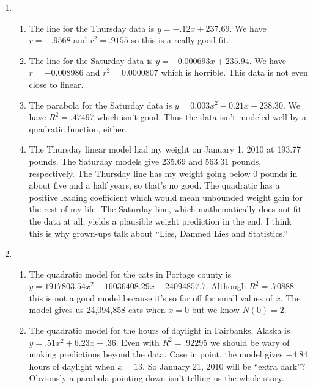 \documentclass{ximera}
\begin{document}
\begin{enumerate}
\setcounter{enumi}{\value{HW}}

\item \begin{enumerate}

\item The line for the Thursday data is $y = -.12x + 237.69$.  We have $r = -.9568$ and $r^{2} = .9155$ so this is a really good fit.

\item The line for the Saturday data is $y = -0.000693x + 235.94$.  We have $r = -0.008986$ and $r^{2} = 0.0000807$ which is horrible.  This data is not even close to linear.  

\item The parabola for the Saturday data is $y = 0.003x^{2} - 0.21x + 238.30$.  We have $R^{2} = .47497$ which isn't good.  Thus the data isn't modeled well by a quadratic function, either.

\item The Thursday linear model had my weight on January 1, 2010 at 193.77 pounds.  The Saturday models give 235.69 and 563.31 pounds, respectively.  The Thursday line has my weight going below 0 pounds in about five and a half years, so that's no good.  The quadratic has a positive leading coefficient which would mean unbounded weight gain for the rest of my life.  The Saturday line, which mathematically does not fit the data at all, yields a plausible weight prediction in the end.  I think this is why grown-ups talk about ``Lies, Damned Lies and Statistics.''

\end{enumerate}

\item \begin{enumerate}

\item The quadratic model for the cats in Portage county is $y = 1917803.54x^{2} - 16036408.29x + 24094857.7$.  Although $R^{2} = .70888$ this is not a good model because it's so far off for small values of $x$.  The model gives us 24,094,858 cats when $x = 0$ but we know $N(0) = 2$.

\item The quadratic model for the hours of daylight in Fairbanks, Alaska is $y = .51x^{2} + 6.23x - .36$.  Even with $R^{2} = .92295$ we should be wary of making predictions beyond the data.  Case in point, the model gives $-4.84$ hours of daylight when $x = 13$.  So January 21, 2010 will be ``extra dark''?  Obviously a parabola pointing down isn't telling us the whole story.

\end{enumerate}

\setcounter{HW}{\value{enumi}}
\end{enumerate}
\end{document}
